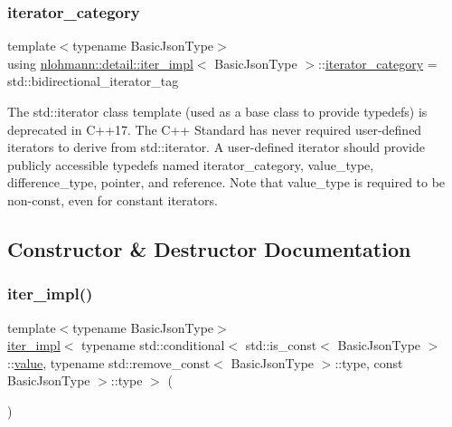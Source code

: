 \subsubsection{\texorpdfstring{iterator\+\_\+category}{iterator\_category}}
{\footnotesize\ttfamily template$<$typename Basic\+Json\+Type$>$ \\
using \mbox{\hyperlink{classnlohmann_1_1detail_1_1iter__impl}{nlohmann\+::detail\+::iter\+\_\+impl}}$<$ Basic\+Json\+Type $>$\+::\mbox{\hyperlink{classnlohmann_1_1detail_1_1iter__impl_ad9e091f5c70b34b5b1abc1ab15fd9106}{iterator\+\_\+category}} =  std\+::bidirectional\+\_\+iterator\+\_\+tag}

The std\+::iterator class template (used as a base class to provide typedefs) is deprecated in C++17. The C++ Standard has never required user-\/defined iterators to derive from std\+::iterator. A user-\/defined iterator should provide publicly accessible typedefs named iterator\+\_\+category, value\+\_\+type, difference\+\_\+type, pointer, and reference. Note that value\+\_\+type is required to be non-\/const, even for constant iterators. 

\subsection{Constructor \& Destructor Documentation}
\mbox{\label{classnlohmann_1_1detail_1_1iter__impl_a19aa457f9c4af1b7e3af59839132cc5c}} 
\subsubsection{\texorpdfstring{iter\+\_\+impl()}{iter\_impl()}\hspace{0.1cm}{\footnotesize\ttfamily [1/4]}}
{\footnotesize\ttfamily template$<$typename Basic\+Json\+Type$>$ \\
\mbox{\hyperlink{classnlohmann_1_1detail_1_1iter__impl}{iter\+\_\+impl}}$<$ typename std\+::conditional$<$ std\+::is\+\_\+const$<$ Basic\+Json\+Type $>$\+::\mbox{\hyperlink{classnlohmann_1_1detail_1_1iter__impl_ab447c50354c6611fa2ae0100ac17845c}{value}}, typename std\+::remove\+\_\+const$<$ Basic\+Json\+Type $>$\+::type, const Basic\+Json\+Type $>$\+::type $>$ (\begin{DoxyParamCaption}{ }\end{DoxyParamCaption})\hspace{0.3cm}{\ttfamily [default]}}



